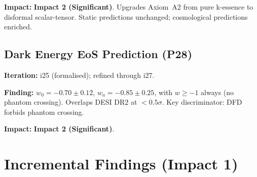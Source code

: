 \documentclass[11pt,a4paper]{article}
\newcommand{\imptwo}{\textcolor{impact2}{\textbf{Impact 2 (Significant)}}}
\begin{document}
\textbf{Impact:} \imptwo. Upgrades Axiom~A2 from pure k-essence to
disformal scalar-tensor. Static predictions unchanged; cosmological
predictions enriched.

\subsection{Dark Energy EoS Prediction (P28)}

\textbf{Iteration:} i25 (formalised); refined through i27.

\textbf{Finding:} $w_0 = -0.70 \pm 0.12$, $w_a = -0.85 \pm 0.25$,
with $w \geq -1$ always (no phantom crossing). Overlaps DESI DR2 at
$< 0.5\sigma$. Key discriminator: DFD forbids phantom crossing.

\textbf{Impact:} \imptwo.


\section{Incremental Findings (Impact 1)}
\label{sec:impact1}
\end{document}
